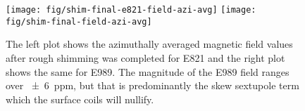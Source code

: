 \begin{figure}
\centering
\texttt{[image: fig/shim-final-e821-field-azi-avg]}
\texttt{[image: fig/shim-final-field-azi-avg]}
\caption{
    The left plot shows the azimuthally averaged magnetic field values after rough shimming was completed for E821 and the right plot shows the same for E989.  The magnitude of the E989 field ranges over \SI{\pm 6}{ppm}, but that is predominantly the skew sextupole term which the surface coils will nullify.
    \label{fig/shim-field-final-azi-avg}
}
\end{figure}